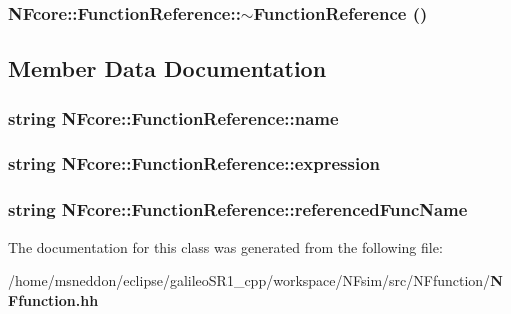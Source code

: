 \subsubsection{\setlength{\rightskip}{0pt plus 5cm}NFcore::FunctionReference::$\sim$FunctionReference ()\hspace{0.3cm}{\tt  [inline]}}\label{classNFcore_1_1FunctionReference_d2ac29775e40bf2ae576b393fc20074f}




\subsection{Member Data Documentation}
\subsubsection{\setlength{\rightskip}{0pt plus 5cm}string {\bf NFcore::FunctionReference::name}}\label{classNFcore_1_1FunctionReference_e3d88d74e201844befead12aa4ec9158}


\subsubsection{\setlength{\rightskip}{0pt plus 5cm}string {\bf NFcore::FunctionReference::expression}}\label{classNFcore_1_1FunctionReference_77611626d975657ebd7bede79964515d}


\subsubsection{\setlength{\rightskip}{0pt plus 5cm}string {\bf NFcore::FunctionReference::referencedFuncName}}\label{classNFcore_1_1FunctionReference_2d9b85311cb3ee087e464f1258181e93}




The documentation for this class was generated from the following file:\begin{CompactItemize}
\item 
/home/msneddon/eclipse/galileoSR1\_\-cpp/workspace/NFsim/src/NFfunction/{\bf NFfunction.hh}\end{CompactItemize}
